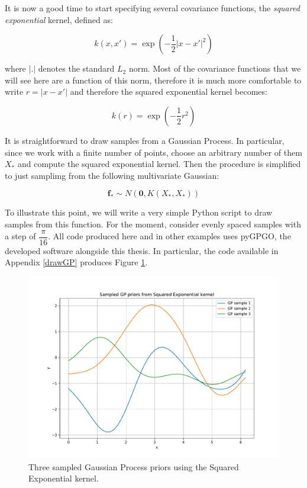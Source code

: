 \documentclass[10pt,a4paper,twoside]{book}
\begin{document}
It is now a good time to start specifying several covariance functions, the \textit{squared exponential} kernel, defined as:

\begin{equation}
k(x, x') = \exp\left(-\dfrac{1}{2}|x - x'|^2\right)
\end{equation}

where $|.|$ denotes the standard $L_2$ norm. Most of the covariance functions that we will see here are a function of this norm, therefore it is much more comfortable to write $r = |x - x'|$ and therefore the squared exponential kernel becomes:

\begin{equation}
\label{sqexp}
k(r) = \exp\left(-\dfrac{1}{2}r^2\right)
\end{equation}

It is straightforward to draw samples from a Gaussian Process. In particular, since we work with a finite number of points, choose an arbitrary number of them $X_*$ and compute the squared exponential kernel. Then the procedure is simplified to just samplimg from the following multivariate Gaussian:

\begin{equation}
\label{fprior}
\boldsymbol{f_*} \sim N\left(\boldsymbol{0}, K(X_*, X_*)\right)
\end{equation}

To illustrate this point, we will write a very simple Python script to draw samples from this function. For the moment, consider evenly spaced samples with a step of $\dfrac{\pi}{16}$. All code produced here and in other examples uses pyGPGO, the developed software alongside this thesis. In particular, the code available in Appendix \ref{drawGP} produces Figure \ref{fig:drawPrior}.\\

\begin{figure}
\caption{Three sampled Gaussian Process priors using the Squared Exponential kernel.}
\label{fig:drawPrior}
\includegraphics[width=\textwidth]{figures/chapter2/drawPrior}
\end{figure}
\end{document}
